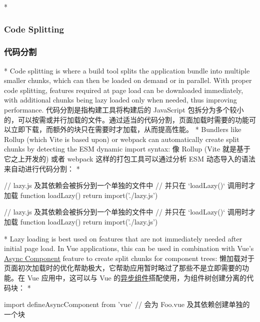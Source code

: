 \begin{paracol}{2} 
 
\switchcolumn[0]*%
\subsubsection{Code Splitting}
\switchcolumn
\subsubsection{代码分割}
\switchcolumn[0]*%
Code splitting is where a build tool splits the application bundle into
multiple smaller chunks, which can then be loaded on demand or in
parallel. With proper code splitting, features required at page load can
be downloaded immediately, with additional chunks being lazy loaded only
when needed, thus improving performance.
\switchcolumn
代码分割是指构建工具将构建后的 JavaScript
包拆分为多个较小的，可以按需或并行加载的文件。通过适当的代码分割，页面加载时需要的功能可以立即下载，而额外的块只在需要时才加载，从而提高性能。
\switchcolumn[0]*%
Bundlers like Rollup (which Vite is based upon) or webpack can
automatically create split chunks by detecting the ESM dynamic import
syntax:
\switchcolumn
像 Rollup (Vite 就是基于它之上开发的) 或者 webpack
这样的打包工具可以通过分析 ESM 动态导入的语法来自动进行代码分割：
\switchcolumn[0]*%
\begin{codeJs}
// lazy.js 及其依赖会被拆分到一个单独的文件中
// 并只在 `loadLazy()` 调用时才加载
function loadLazy() {
  return import('./lazy.js')
}
\end{codeJs}
\switchcolumn
\begin{codeJs}
// lazy.js 及其依赖会被拆分到一个单独的文件中
// 并只在 `loadLazy()` 调用时才加载
function loadLazy() {
  return import('./lazy.js')
}
\end{codeJs}
\switchcolumn[0]*%
Lazy loading is best used on features that are not immediately needed
after initial page load. In Vue applications, this can be used in
combination with Vue's
\href{https://vuejs.org/guide/components/async.html}{Async Component}
feature to create split chunks for component trees:
\switchcolumn
懒加载对于页面初次加载时的优化帮助极大，它帮助应用暂时略过了那些不是立即需要的功能。在
Vue 应用中，这可以与 Vue
的\href{https://cn.vuejs.org/guide/components/async.html}{异步组件}搭配使用，为组件树创建分离的代码块：
\switchcolumn[0]*%
\begin{codeJs}
import { defineAsyncComponent } from 'vue'
// 会为 Foo.vue 及其依赖创建单独的一个块

\end{codeJs}
\end{paracol}
